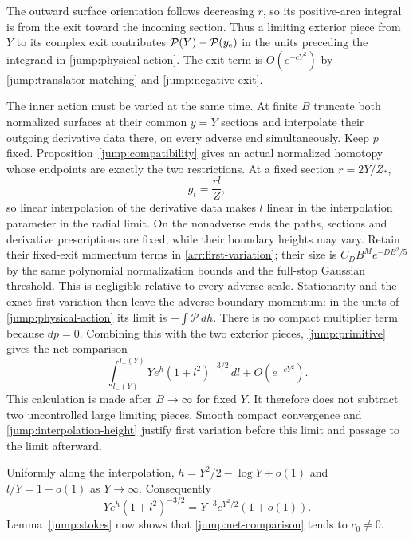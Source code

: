 The outward surface orientation follows decreasing $r$, so its
positive-area integral is from the exit toward the incoming
section.  Thus a limiting exterior piece from $Y$ to its complex
exit contributes
$\mathcal P(Y)-\mathcal P(y_{\rm e})$ in the units preceding
the integrand in \eqref{jump:physical-action}.  The exit term
is $O(e^{-cY^2})$ by \eqref{jump:translator-matching} and
\eqref{jump:negative-exit}.

The inner action must be varied at the same time.  At finite $B$
truncate both normalized surfaces at their common $y=Y$ sections
and interpolate their outgoing derivative data there, on every
adverse end simultaneously.  Keep $p$ fixed.
Proposition~\ref{jump:compatibility} gives an actual normalized homotopy
whose endpoints are exactly the two restrictions.  At a fixed
section $r=2Y/Z_*$,
\[
 g_t=\frac{rl}{Z},
\]
so linear interpolation of the derivative data makes $l$ linear
in the interpolation parameter in the radial limit.  On the
nonadverse ends the paths, sections and derivative prescriptions are
fixed, while their boundary heights may vary.  Retain their fixed-exit
momentum terms in \cref{arr:first-variation}; their size is
$C_D B^M e^{-DB^2/5}$ by the same polynomial normalization bounds and
the full-stop Gaussian threshold.  This is negligible relative to
every adverse scale.  Stationarity and the exact first variation then
leave the adverse boundary momentum: in the units of
\eqref{jump:physical-action} its limit is $-\int\mathcal P\,dh$.
There is no compact multiplier term
because $dp=0$.  Combining this with the two exterior pieces,
\eqref{jump:primitive} gives the net comparison
\begin{equation}\label{jump:net-comparison}
 \int_{l_-(Y)}^{l_+(Y)}
                Ye^h(1+l^2)^{-3/2}\,dl+O(e^{-cY^2}).
\end{equation}
This calculation is made after $B\to\infty$ for fixed $Y$.
It therefore does not subtract two uncontrolled large limiting
pieces.  Smooth compact convergence and
\eqref{jump:interpolation-height}
justify first variation before this limit and passage to the
limit afterward.

Uniformly along the interpolation,
$h=Y^2/2-\log Y+o(1)$ and $l/Y=1+o(1)$ as $Y\to\infty$.
Consequently
\[
 Ye^h(1+l^2)^{-3/2}
       =Y^{-3}e^{Y^2/2}(1+o(1)).
\]
Lemma~\ref{jump:stokes} now shows that
\eqref{jump:net-comparison} tends to $c_0\ne0$.


